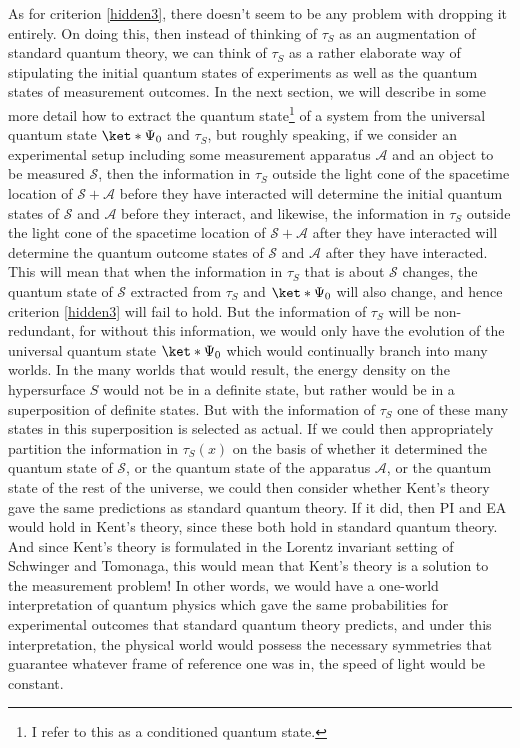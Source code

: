 \documentclass[12pt]{report}
\begin{document}
As for criterion \ref{hidden3}, there doesn't seem to be any problem with dropping it entirely. On doing this, then instead of thinking of $\tau_S$ as an augmentation of standard quantum theory, we can think of $\tau_S$ as a rather elaborate way of stipulating the initial quantum states of experiments as well as the quantum states of measurement outcomes. In the next section, we will describe in some more detail how to extract the quantum state\footnote{I refer to this as a conditioned quantum state.} of a system from the universal quantum state $\ket*{\Psi_0}$ and $\tau_S$, but roughly speaking, if we consider an experimental setup including some measurement apparatus $\mathcal{A}$ and an object to be measured $\mathcal{S}$, then the information in  $\tau_S$ outside the light cone of the spacetime location of $\mathcal{S}+\mathcal{A}$ before they have interacted will determine the initial quantum states of $\mathcal{S}$ and $\mathcal{A}$ before they interact, and likewise, the information in  $\tau_S$ outside the light cone of the spacetime location of $\mathcal{S}+\mathcal{A}$ after they have interacted will determine the quantum outcome states of $\mathcal{S}$ and $\mathcal{A}$ after they have interacted. This will mean that when the information in $\tau_S$ that is about $\mathcal{S}$ changes, the quantum state of $\mathcal{S}$ extracted from $\tau_S$ and   $\ket*{\Psi_0}$ will also change, and hence criterion \ref{hidden3} will fail to hold. But the information of $\tau_S$ will be non-redundant, for without this information, we would only have the evolution of the universal quantum state $\ket*{\Psi_0}$ which would continually branch into many worlds. In the many worlds that would result, the energy density on the hypersurface $S$ would not be in a definite state, but rather would be in a superposition of definite states. But with the information of $\tau_S$ one of these many states in this superposition is selected as actual. If we could then appropriately partition the information in $\tau_S(x)$ on the basis of whether it determined the quantum state of $\mathcal{S}$, or the quantum state of the apparatus $\mathcal{A}$, or the quantum state of the rest of the universe, we could then consider whether Kent's theory gave the same predictions as standard quantum theory. If it did, then PI and EA would hold in Kent's theory, since these both hold in standard quantum theory. And since Kent's theory is formulated in the Lorentz invariant setting of Schwinger and Tomonaga, this would mean that Kent's theory is a solution to the measurement problem! In other words, we would have a one-world interpretation of quantum physics which gave the same probabilities for experimental outcomes that standard quantum theory predicts, and under this interpretation, the physical world would possess the necessary symmetries that guarantee whatever frame of reference one was in, the speed of light would be constant.  
\end{document}
